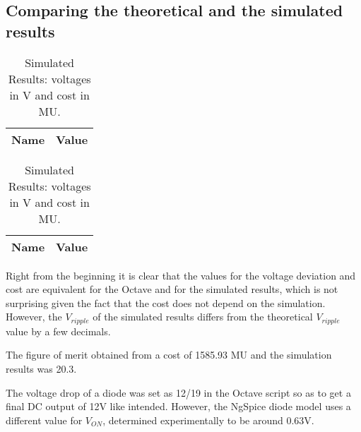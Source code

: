 \subsection{Comparing the theoretical and the simulated results}

\begin{table}[htp]
\parbox{.5\linewidth}{
\centering                
\def\arraystretch{1}        %

\begin{tabular}{c|c}        %
\hline                      %

\textbf{Name}  & \textbf{Value}\\     
\hline                      %

\hline                      %
\end{tabular}
\captionsetup{justification=justified, margin=0.5cm} 
\caption{Theoretical Results: voltages in V and cost in MU.}
\label{tab7}
}
\hfill
\parbox{.5\linewidth}{
\centering
\def\arraystretch{1}

\begin{tabular}{c|c}
\hline    
\textbf{Name} & \textbf{Value} \\ \hline

\hline
\end{tabular}
\captionsetup{justification=justified, margin=0.5cm} 
\caption{Simulated Results: voltages in V and cost in MU.}
\label{tab8}
}
\end{table}
\FloatBarrier

Right from the beginning it is clear that the values for the voltage deviation and cost are equivalent for the Octave \cite{bib:octave} and for the simulated results, which is not surprising given the fact that the cost does not depend on the simulation. However, the $V_{ripple}$ of the simulated results differs from the theoretical $V_{ripple}$ value by a few decimals.

The figure of merit obtained from a cost of 1585.93 MU and the simulation results was 20.3.

The voltage drop of a diode was set as 12/19 in the Octave script so as to get a final DC output of 12V like intended. However, the NgSpice \cite{bib:ngspice} diode model uses a different value for $V_{ON}$, determined experimentally to be around 0.63V. 

